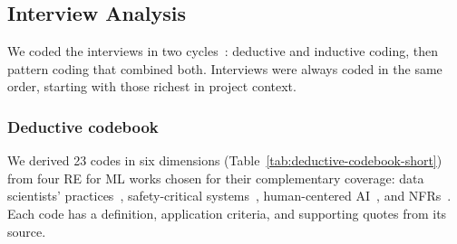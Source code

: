 \documentclass[sigconf,nonacm]{acmart}
\newif\ifshownotes
\newcommand{\gnote}[1]{\ifshownotes{\color{blue}\textbf{[G:} #1\textbf{]}}\fi}
\newcommand{\rnote}[1]{\ifshownotes{\color{red}\textbf{[R:} #1\textbf{]}}\fi}
\begin{document}


\subsection{Interview Analysis}
\label{sec:codificacao}
We coded the interviews in two cycles~\cite{saldana2009coding}: deductive and inductive coding, then pattern coding that combined both. Interviews were always coded in the same order, starting with those richest in project context.


\subsubsection{Deductive codebook}
We derived 23 codes in six dimensions (Table~\ref{tab:deductive-codebook-short}) from four RE for ML works chosen for their complementary coverage: data scientists' practices~\cite{vogelsang2019}, safety-critical systems~\cite{habibullah2023}, human-centered AI~\cite{ahmad2023}, and NFRs~\cite{horkoff2019}. Each code has a definition, application criteria, and supporting quotes from its source.
\end{document}
